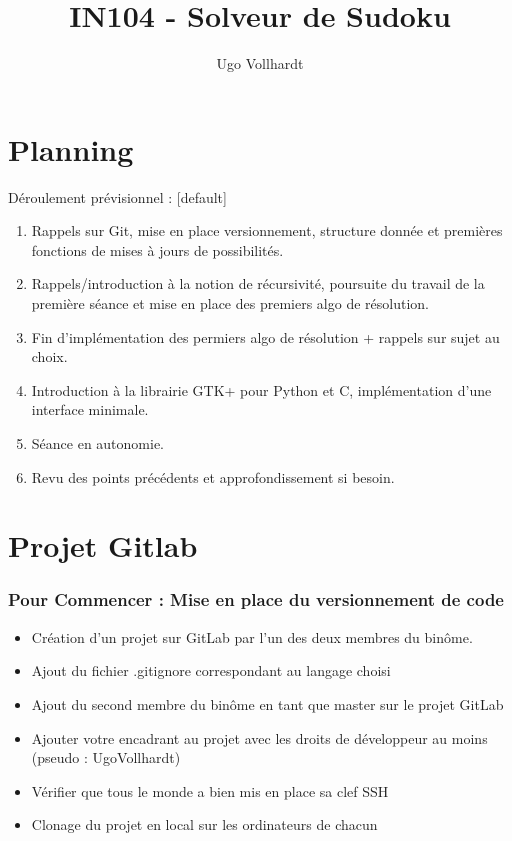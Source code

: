 \documentclass{beamer}
\title{IN104 - Solveur de Sudoku}
\author{Ugo Vollhardt}
\institute{CEA LIST}
\begin{document}
	\maketitle
	\section{Planning}
	\begin{frame}
	Déroulement prévisionnel : 
	[default]
	\begin{enumerate}
		\item Rappels sur Git, mise en place versionnement, structure donnée et premières fonctions de mises à jours de possibilités.
		\item Rappels/introduction à la notion de récursivité, poursuite du travail de la première séance et mise en place des premiers algo de résolution.
		\item Fin d'implémentation des permiers algo de résolution + rappels sur sujet au choix.
		\item Introduction à la librairie GTK+ pour Python et C, implémentation d'une interface minimale.
		\item Séance en autonomie.
		\item Revu des points précédents et approfondissement si besoin.
	\end{enumerate}
	\end{frame}
	\section{Projet Gitlab}
	\begin{frame}
	\frametitle{Pour Commencer : Mise en place du versionnement de code}
		\begin{itemize}
			\item Création d'un projet sur GitLab par l'un des deux membres du binôme.
			\item Ajout du fichier .gitignore correspondant au langage choisi
			\item Ajout du second membre du binôme en tant que master sur le projet GitLab
			\item Ajouter votre encadrant au projet avec les droits de développeur au moins (pseudo : UgoVollhardt)
			\item Vérifier que tous le monde a bien mis en place sa clef SSH
			\item Clonage du projet en local sur les ordinateurs de chacun
		\end{itemize}
	\end{frame}
\end{document}
